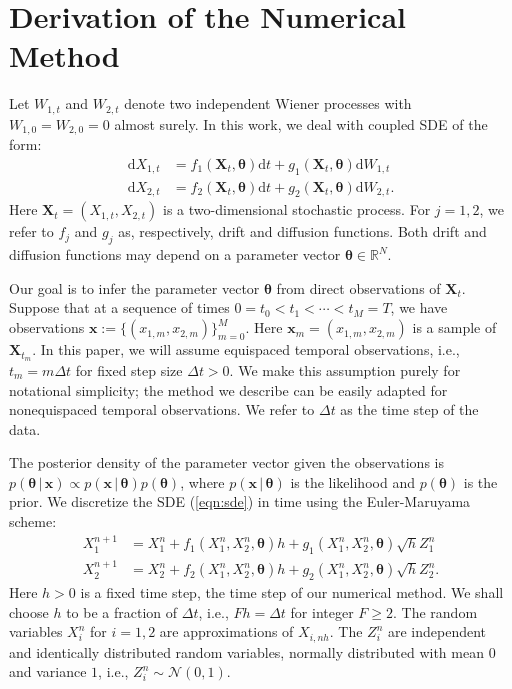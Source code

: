\documentclass[graybox]{svmult}
\newcommand{\btheta}{\ensuremath{\boldsymbol{\theta}}}
\begin{document}
\section{Derivation of the Numerical Method}
\label{sec:2}
Let $W_{1,t}$ and $W_{2,t}$ denote two independent Wiener processes with $W_{1,0} = W_{2,0} = 0$ almost surely. In this work, we deal with coupled SDE of the form:
\begin{subequations}
\label{eqn:sde}
\begin{align}
\mathrm{d}X_{1,t} &= f_1(\mathbf{X}_t, \btheta)\mathrm{d}t + g_1(\mathbf{X}_t, \btheta) \mathrm{d}W_{1,t} \\
\mathrm{d}X_{2,t} &= f_2(\mathbf{X}_t, \btheta)\mathrm{d}t + g_2(\mathbf{X}_t, \btheta) \mathrm{d}W_{2,t}.
\end{align}
\end{subequations}
Here $\mathbf{X}_t = (X_{1,t}, X_{2,t})$ is a two-dimensional stochastic process. For $j=1, 2$, we refer to $f_j$ and $g_j$ as, respectively, drift and diffusion functions.  Both drift and diffusion functions may depend on a parameter vector $\boldsymbol{\theta}\in \mathbb{R}^{N}$.

Our goal is to infer the parameter vector $\btheta$ from direct observations of $\mathbf{X}_t$.  Suppose that at a sequence of times $0 = t_0 < t_1 < \cdots < t_M = T$, we have observations $\mathbf{x} := \{({x}_{1,m},{x}_{2,m})\}_{m=0}^M$.  Here $\mathbf{x}_m = ({x}_{1,m},{x}_{2,m})$ is a sample of $\mathbf{X}_{t_m}$.  In this paper, we will assume equispaced temporal observations, i.e., $t_m = m \Delta t$ for fixed step size $\Delta t > 0$.  We make this assumption purely for notational simplicity; the method we describe can be easily adapted for nonequispaced temporal observations.  We refer to $\Delta t$ as the time step of the data.

The posterior density of the parameter vector given the observations is
$p(\btheta \, | \, \mathbf{x})  \propto p( \mathbf{x} \, | \, \btheta)  p(\btheta)$,
where $p( \mathbf{x} \, | \, \btheta)$ is the likelihood and $p(\btheta)$ is the prior.  We discretize the SDE (\ref{eqn:sde}) in time using the Euler-Maruyama scheme:
\begin{subequations}
\label{eqn:discretesde}
\begin{align}
X_1^{n+1} &= X_1^{n} + f_1(X_1^n, X_2^n, \btheta)h + g_1(X_1^n, X_2^n,  \btheta) \sqrt{h} Z_1^{n} \\
X_2^{n+1} &= X_2^{n} + f_2(X_1^n, X_2^n,\btheta)h + g_2(X_1^n, X_2^n,\btheta) \sqrt{h} Z_2^{n}.
\end{align}
\end{subequations}
Here $h > 0$ is a fixed time step, the time step of our numerical method.  We shall choose $h$ to be a fraction of $\Delta t$, i.e., $F h = \Delta t$ for integer $F \geq 2$.  The random variables $X_i^n$ for $i=1,2$ are approximations of $X_{i,n h}$.  The $Z_i^n$ are independent and identically distributed random variables, normally distributed with mean $0$ and variance $1$, i.e., $Z_i^n \sim \mathcal{N}(0,1)$.
\end{document}
